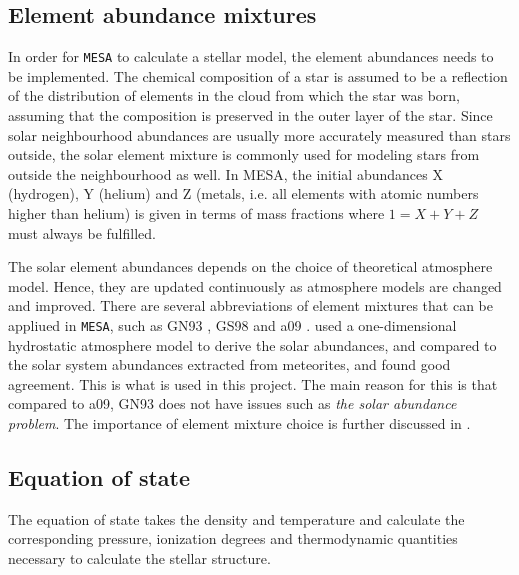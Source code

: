 \subsection{Element abundance mixtures}

In order for \texttt{MESA} to calculate a stellar model, the element abundances needs to be implemented. The chemical composition of a star is assumed to be a reflection of the distribution of elements in the cloud from which the star was born, assuming that the composition is preserved in the outer layer of the star. %
Since solar neighbourhood abundances are usually more accurately measured than stars outside, the solar element mixture is commonly used for modeling stars from outside the neighbourhood as well. In MESA, the initial abundances X (hydrogen), Y (helium) and Z (metals, i.e. all elements with atomic numbers higher than helium) is given in terms of mass fractions where $1=X+Y+Z$ must always be fulfilled. 

The solar element abundances depends on the choice of theoretical atmosphere model. Hence, they are updated continuously as atmosphere models are changed and improved. There are several abbreviations of element mixtures that can be appliued in \texttt{MESA}, such as GN93 \citep{grevesse1993cosmic}, GS98 \citep{grevesse1998standard} and a09 \citep{asplund2009chemical}. %
\citet{grevesse1993cosmic} used a one-dimensional hydrostatic atmosphere model to derive the solar abundances, and compared to the solar system abundances extracted from meteorites, and found good agreement. This is what is used in this project. The main reason for this is that compared to a09, GN93 does not have issues such as \textit{the solar abundance problem}\citep{asplund2009chemical}. The importance of element mixture choice is further discussed in . 

\subsection{Equation of state}

The equation of state takes the density and temperature and calculate the corresponding pressure, ionization degrees and thermodynamic quantities necessary to calculate the stellar structure. 

